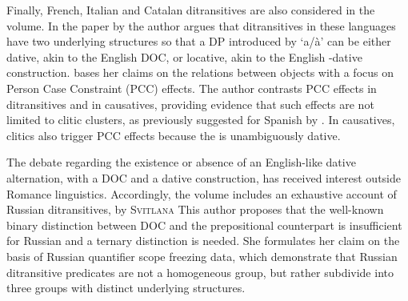 \begin{styleListNumberi}
Finally, French, Italian and Catalan ditransitives are also considered in the volume. In the paper by the author argues that ditransitives in these languages have two underlying structures so that a DP introduced by ‘a/à’ can be either dative, akin to the English DOC, or locative, akin to the English -dative construction. bases her claims on the relations between objects with a focus on Person Case Constraint (PCC) effects. The author contrasts PCC effects in ditransitives and in causatives, providing evidence that such effects are not limited to clitic clusters, as previously suggested for Spanish by \citet{OrmazabalRomero2013}. In causatives, clitics also trigger PCC effects because the  is unambiguously dative.
\end{styleListNumberi}

\begin{styleListNumberi}
The debate regarding the existence or absence of an English-like dative alternation, with a DOC and a dative construction, has received interest outside Romance linguistics. Accordingly, the volume includes an exhaustive account of Russian ditransitives, by \textsc{Svitlana} This author proposes that the well-known binary distinction between DOC and the prepositional counterpart is insufficient for Russian and a ternary distinction is needed. She formulates her claim on the basis of Russian quantifier scope freezing data, which demonstrate that Russian ditransitive predicates are not a homogeneous group, but rather subdivide into three groups with distinct underlying structures. 
\end{styleListNumberi}

